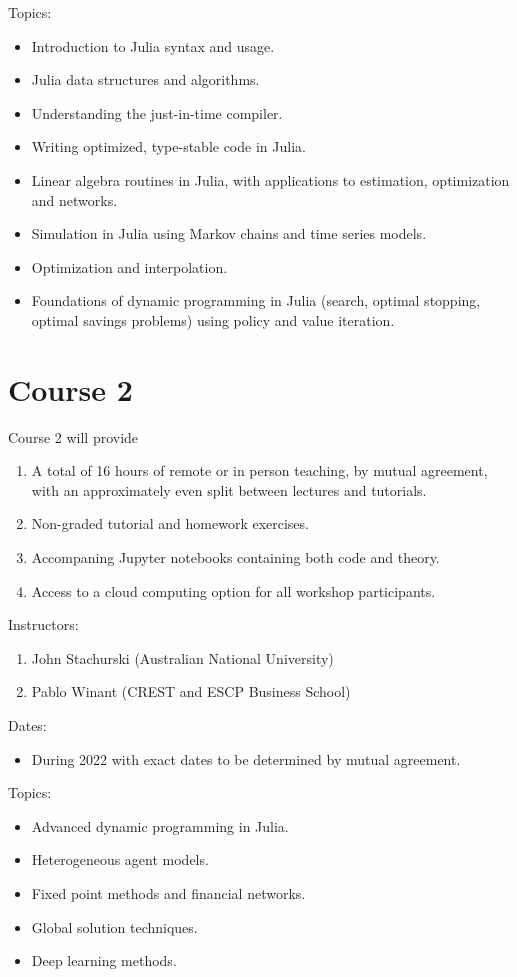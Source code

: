 \documentclass[12pt]{article}
\begin{document}
Topics:
%
\begin{itemize}
    \item Introduction to Julia syntax and usage.
    \item Julia data structures and algorithms.
    \item Understanding the just-in-time compiler.
    \item Writing optimized, type-stable code in Julia.
    \item Linear algebra routines in Julia, with applications to estimation,
        optimization and networks.
    \item Simulation in Julia using Markov chains and time series models.
    \item Optimization and interpolation.
    \item Foundations of dynamic programming in Julia (search, optimal
        stopping, optimal savings problems) using policy and value iteration.
\end{itemize}

\section{Course 2}

Course 2 will provide 
%
\begin{enumerate}
    \item A total of 16 hours of remote or in person teaching, by mutual
        agreement, with an approximately even split between lectures and
        tutorials.
    \item Non-graded tutorial and homework exercises.
    \item Accompaning Jupyter notebooks containing both code and theory.
    \item Access to a cloud computing option for all workshop participants.
\end{enumerate}

Instructors:
%
\begin{enumerate}
    \item John Stachurski (Australian National University)
    \item Pablo Winant (CREST and ESCP Business School)
\end{enumerate}

Dates: 
%
\begin{itemize}
    \item During 2022 with exact dates to be determined by mutual agreement.
\end{itemize}

Topics:
%
\begin{itemize}
    \item Advanced dynamic programming in Julia.
    \item Heterogeneous agent models.
    \item Fixed point methods and financial networks.
    \item Global solution techniques.
    \item Deep learning methods.
\end{itemize}
\end{document}
